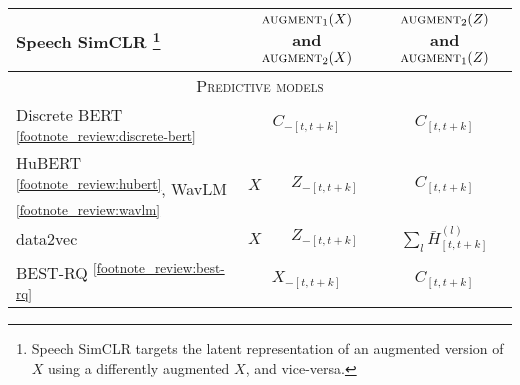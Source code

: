 \begin{table}
{\begin{tabular}{l|c|c|c}
    \midrule
    Speech SimCLR \parencite{jiang_speech_2021}\footnote{Speech SimCLR targets the latent representation of an augmented version of $X$ using a differently augmented $X$, and vice-versa.}    & \multicolumn{2}{c|}{$\textsc{augment}_1(X)$ and $\textsc{augment}_2(X)$}     &    $\textsc{augment}_2(Z)$ and $\textsc{augment}_1(Z)$   \\ 
    \midrule
    \midrule 
    \multicolumn{4}{c}{\textsc{Predictive models}} \\
    \midrule
    \midrule
    Discrete BERT~\parencite{baevski_vqwav2vec_2020,baevski_effectiveness_2020} \textsuperscript{\ref{footnote_review:discrete-bert}}      &   \multicolumn{2}{c|}{$C_{-[t,t+k]}$}   & $C_{[t,t+k]}$  \\
    \midrule 
    HuBERT \parencite{hsu_hubert_2021}\textsuperscript{\ref{footnote_review:hubert}}, WavLM \parencite{chen_wavlm_2021}\textsuperscript{\ref{footnote_review:wavlm}}  & $X$             & $Z_{-[t,t+k]}$          & $C_{[t,t+k]}$  \\ 
    \midrule
    data2vec \parencite{baevski_data2vec_2022}    & $X$             & $Z_{-[t,t+k]}$          & $\sum_{l}\bar{H}^{(l)}_{[t,t+k]}$  \\ 
    \midrule 
    BEST-RQ \parencite{chiu_selfsupervised_2022}\textsuperscript{\ref{footnote_review:best-rq}}    &  \multicolumn{2}{c|}{$X_{-[t,t+k]}$}      &  $C_{[t,t+k]}$   \\ 
    \midrule 
    \bottomrule
\end{tabular}
}
    
\label{table:pretext}
\end{table}


